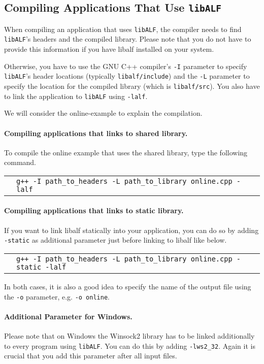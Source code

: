 \documentclass[a4paper, fontsize=11pt, DIV=12, parskip=half]{scrartcl}
\newcommand{\libalf}{\texttt{libALF}\xspace}
\newcommand{\cmd}[1]{
\begin{tabular}{p{.025\textwidth}l}
&\begin{minipage}{.85\textwidth}\texttt{#1}\end{minipage}
\end{tabular}
}
\begin{document}
\subsection{Compiling Applications That Use \libalf}
When compiling an application that uses \libalf, the compiler needs to find \libalf's headers and the compiled library. Please note that you do not have to provide this information if you have libalf installed on your system.

Otherwise, you have to use the GNU C++ compiler's \texttt{-I} parameter to specify \libalf's header locations (typically \texttt{libalf/include}) and the \texttt{-L} parameter to specify the location for the compiled library (which is \texttt{libalf/src}). You also have to link the application to \libalf using \texttt{-lalf}.

We will consider the online-example to explain the compilation.

\paragraph{Compiling applications that links to shared library.}
To compile the online example that uses the shared library, type the following command.

\cmd{g++ -I path\_to\_headers -L path\_to\_library online.cpp -lalf}

\paragraph{Compiling applications that links to static library.}
If you want to link libalf statically into your application, you can do so by adding \texttt{-static} as additional parameter just before linking to libalf like below.

\cmd{g++ -I path\_to\_headers -L path\_to\_library online.cpp -static -lalf}

In both cases, it is also a good idea to specify the name of the output file using the \texttt{-o} parameter, e.g. \texttt{-o online}.

\paragraph{Additional Parameter for Windows.}
Please note that on Windows the Winsock2 library has to be linked additionally to every program using \libalf. You can do this by adding \texttt{-lws2\_32}. Again it is crucial that you add this parameter after all input files.
\end{document}
